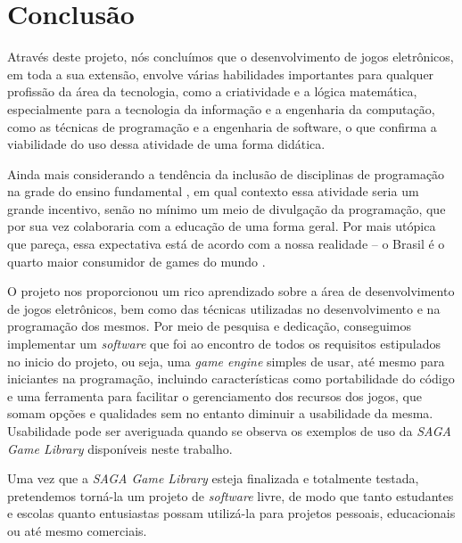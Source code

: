 \chapter{Conclusão}
\label{cap:conclusao}

Através deste projeto, nós concluímos que o desenvolvimento de jogos eletrônicos, em toda a sua extensão, envolve várias habilidades importantes para qualquer profissão da área da tecnologia, como a criatividade e a lógica matemática, especialmente para a tecnologia da informação e a engenharia da computação, como as técnicas de programação e a engenharia de software, o que confirma a viabilidade do uso dessa atividade de uma forma didática.
\par
Ainda mais considerando a tendência da inclusão de disciplinas de programação na grade do ensino fundamental \nocite{OLHARDIG}, em qual contexto essa atividade seria um grande incentivo, senão no mínimo um meio de divulgação da programação, que por sua vez colaboraria com a educação de uma forma geral. Por mais utópica que pareça, essa expectativa está de acordo com a nossa realidade -- o Brasil é o quarto maior consumidor de games do mundo \nocite{ESTADAO}. 
\par 
O projeto nos proporcionou um rico aprendizado sobre a área de desenvolvimento de jogos eletrônicos, bem como das técnicas utilizadas no desenvolvimento e na programação dos mesmos. Por meio de pesquisa e dedicação, conseguimos implementar um \textit{software} que foi ao encontro de todos os requisitos estipulados no inicio do projeto, ou seja, uma \textit{game engine} simples de usar, até mesmo para iniciantes na programação, incluindo características como portabilidade do código e uma ferramenta para facilitar o gerenciamento dos recursos dos jogos, que somam opções e qualidades sem no entanto diminuir a usabilidade da mesma. Usabilidade pode ser averiguada quando se observa os exemplos de uso da \textit{SAGA Game Library} disponíveis neste trabalho.
\par
Uma vez que a \textit{SAGA Game Library} esteja finalizada e totalmente testada, pretendemos torná-la um projeto de \textit{software} livre, de modo que tanto estudantes e escolas quanto entusiastas possam utilizá-la para projetos pessoais, educacionais ou até mesmo comerciais.